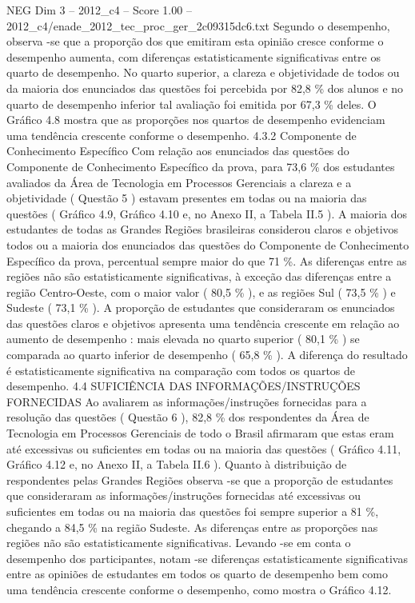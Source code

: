 \begin{textsample}{NEG Dim 3 – 2012\_c4 – Score 1.00 – 2012\_c4/enade\_2012\_tec\_proc\_ger\_2c09315dc6.txt}
Segundo o desempenho, observa -se que a proporção dos que emitiram esta opinião cresce conforme o desempenho aumenta, com diferenças estatisticamente significativas entre os quarto de desempenho.
No quarto superior, a clareza e objetividade de todos ou da maioria dos enunciados das questões foi percebida por 82,8 \% dos alunos e no quarto de desempenho inferior tal avaliação foi emitida por 67,3 \% deles.
O Gráfico 4.8 mostra que as proporções nos quartos de desempenho evidenciam uma tendência crescente conforme o desempenho. 4.3.2 Componente de Conhecimento Específico Com relação aos enunciados das questões do Componente de Conhecimento Específico da prova, para 73,6 \% dos estudantes avaliados da Área de Tecnologia em Processos Gerenciais a clareza e a objetividade ( Questão 5 ) estavam presentes em todas ou na maioria das questões ( Gráfico 4.9, Gráfico 4.10 e, no Anexo II, a Tabela II.5 ).
A maioria dos estudantes de todas as Grandes Regiões brasileiras considerou claros e objetivos todos ou a maioria dos enunciados das questões do Componente de Conhecimento Específico da prova, percentual sempre maior do que 71 \%.
As diferenças entre as regiões não são estatisticamente significativas, à exceção das diferenças entre a região Centro-Oeste, com o maior valor ( 80,5 \% ), e as regiões Sul ( 73,5 \% ) e Sudeste ( 73,1 \% ).
A proporção de estudantes que consideraram os enunciados das questões claros e objetivos apresenta uma tendência crescente em relação ao aumento de desempenho : mais elevada no quarto superior ( 80,1 \% ) se comparada ao quarto inferior de desempenho ( 65,8 \% ).
A diferença do resultado é estatisticamente significativa na comparação com todos os quartos de desempenho. 4.4 SUFICIÊNCIA DAS INFORMAÇÕES/INSTRUÇÕES FORNECIDAS Ao avaliarem as informações/instruções fornecidas para a resolução das questões ( Questão 6 ), 82,8 \% dos respondentes da Área de Tecnologia em Processos Gerenciais de todo o Brasil afirmaram que estas eram até excessivas ou suficientes em todas ou na maioria das questões ( Gráfico 4.11, Gráfico 4.12 e, no Anexo II, a Tabela II.6 ).
Quanto à distribuição de respondentes pelas Grandes Regiões observa -se que a proporção de estudantes que consideraram as informações/instruções fornecidas até excessivas ou suficientes em todas ou na maioria das questões foi sempre superior a 81 \%, chegando a 84,5 \% na região Sudeste.
As diferenças entre as proporções nas regiões não são estatisticamente significativas.
Levando -se em conta o desempenho dos participantes, notam -se diferenças estatisticamente significativas entre as opiniões de estudantes em todos os quarto de desempenho bem como uma tendência crescente conforme o desempenho, como mostra o Gráfico 4.12.

\end{textsample}

